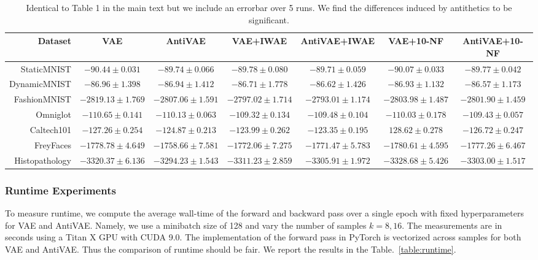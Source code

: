 \begin{table}
\tiny
\centering
\begin{tabular}{r|cccccc}
    Dataset & VAE & AntiVAE & VAE+IWAE & AntiVAE+IWAE & VAE+10-NF & AntiVAE+10-NF \\
    \toprule
    StaticMNIST & $-90.44 \pm 0.031$ & $-89.74 \pm 0.066$ & $-89.78 \pm 0.080$ & $-89.71 \pm 0.059$ & $-90.07 \pm 0.033$ & $-89.77 \pm 0.042$ \\
    DynamicMNIST & $-86.96 \pm 1.398$ & $-86.94 \pm 1.412$ & $-86.71 \pm 1.778$ & $-86.62 \pm 1.426$ & $-86.93 \pm 1.132$ & $-86.57 \pm 1.173$ \\
    FashionMNIST & $-2819.13 \pm 1.769$ & $-2807.06 \pm 1.591$ & $-2797.02 \pm 1.714$ & $-2793.01 \pm 1.174$ & $-2803.98 \pm 1.487$ & $-2801.90 \pm 1.459$ \\
    Omniglot & $-110.65 \pm 0.141$ & $-110.13 \pm 0.063$ & $-109.32 \pm 0.134$ & $-109.48 \pm 0.104$ & $-110.03 \pm 0.178$ & $-109.43 \pm 0.057$ \\
    Caltech101 & $-127.26 \pm 0.254$ & $-124.87 \pm 0.213$ & $-123.99 \pm 0.262$ & $-123.35 \pm 0.195$ & $128.62 \pm 0.278$ & $-126.72 \pm 0.247$ \\
    FreyFaces & $-1778.78 \pm 4.649$ & $-1758.66 \pm 7.581$ & $-1772.06 \pm 7.275$ & $-1771.47 \pm 5.783$ & $-1780.61 \pm 4.595$ & $-1777.26 \pm 6.467$ \\
    Histopathology & $-3320.37 \pm 6.136$ & $-3294.23 \pm 1.543$ & $-3311.23 \pm 2.859$ & $-3305.91 \pm 1.972$ & $-3328.68 \pm 5.426$ & $-3303.00 \pm 1.517$ \\
    \end{tabular}
\caption{Identical to Table 1 in the main text but we include an errorbar over 5 runs. We find the differences induced by antithetics to be significant.}
\label{table:error}
\end{table}

\subsubsection{Runtime Experiments}
To measure runtime, we compute the average wall-time of the forward and backward pass over a single epoch with fixed hyperparameters for VAE and AntiVAE. Namely, we use a minibatch size of 128 and vary the number of samples $k=8, 16$. The measurements are in seconds using a Titan X GPU with CUDA 9.0. The implementation of the forward pass in PyTorch is vectorized across samples for both VAE and AntiVAE. Thus the comparison of runtime should be fair. We report the results in the Table.~\ref{table:runtime}.

